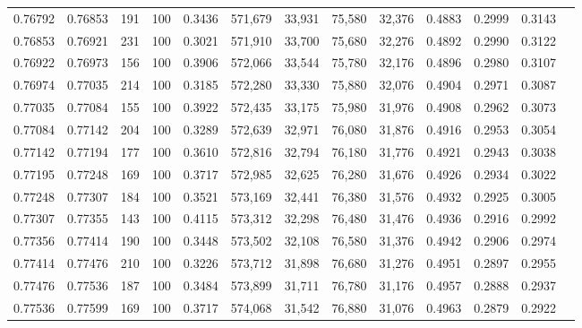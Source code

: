 \begin{tabular}{rrrrrrrrrrrrr}
0.76792 & 0.76853 &   191 & 100 &                                     0.3436 & 571,679 &  33,931 &  75,580 &  32,376 & 0.4883 & 0.2999 & 0.3143 \\
0.76853 & 0.76921 &   231 & 100 &                                     0.3021 & 571,910 &  33,700 &  75,680 &  32,276 & 0.4892 & 0.2990 & 0.3122 \\
0.76922 & 0.76973 &   156 & 100 &                                     0.3906 & 572,066 &  33,544 &  75,780 &  32,176 & 0.4896 & 0.2980 & 0.3107 \\
0.76974 & 0.77035 &   214 & 100 &                                     0.3185 & 572,280 &  33,330 &  75,880 &  32,076 & 0.4904 & 0.2971 & 0.3087 \\
0.77035 & 0.77084 &   155 & 100 &                                     0.3922 & 572,435 &  33,175 &  75,980 &  31,976 & 0.4908 & 0.2962 & 0.3073 \\
0.77084 & 0.77142 &   204 & 100 &                                     0.3289 & 572,639 &  32,971 &  76,080 &  31,876 & 0.4916 & 0.2953 & 0.3054 \\
0.77142 & 0.77194 &   177 & 100 &                                     0.3610 & 572,816 &  32,794 &  76,180 &  31,776 & 0.4921 & 0.2943 & 0.3038 \\
0.77195 & 0.77248 &   169 & 100 &                                     0.3717 & 572,985 &  32,625 &  76,280 &  31,676 & 0.4926 & 0.2934 & 0.3022 \\
0.77248 & 0.77307 &   184 & 100 &                                     0.3521 & 573,169 &  32,441 &  76,380 &  31,576 & 0.4932 & 0.2925 & 0.3005 \\
0.77307 & 0.77355 &   143 & 100 &                                     0.4115 & 573,312 &  32,298 &  76,480 &  31,476 & 0.4936 & 0.2916 & 0.2992 \\
0.77356 & 0.77414 &   190 & 100 &                                     0.3448 & 573,502 &  32,108 &  76,580 &  31,376 & 0.4942 & 0.2906 & 0.2974 \\
0.77414 & 0.77476 &   210 & 100 &                                     0.3226 & 573,712 &  31,898 &  76,680 &  31,276 & 0.4951 & 0.2897 & 0.2955 \\
0.77476 & 0.77536 &   187 & 100 &                                     0.3484 & 573,899 &  31,711 &  76,780 &  31,176 & 0.4957 & 0.2888 & 0.2937 \\
0.77536 & 0.77599 &   169 & 100 &                                     0.3717 & 574,068 &  31,542 &  76,880 &  31,076 & 0.4963 & 0.2879 & 0.2922 \\

\end{tabular}
